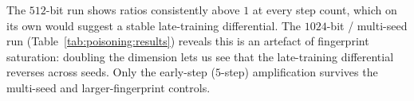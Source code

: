 \documentclass[11pt,a4paper]{article}
\begin{document}
The $512$\nobreakdash-bit run shows ratios consistently above $1$ at
every step count, which on its own would suggest a stable
late\nobreakdash-training differential.  The
$1024$\nobreakdash-bit / multi\nobreakdash-seed run
(Table~\ref{tab:poisoning:results}) reveals this is an
artefact of fingerprint saturation:  doubling the dimension lets
us see that the late\nobreakdash-training differential reverses
across seeds.  Only the early\nobreakdash-step ($5$\nobreakdash-step)
amplification survives the multi\nobreakdash-seed and
larger\nobreakdash-fingerprint controls.



\end{document}
